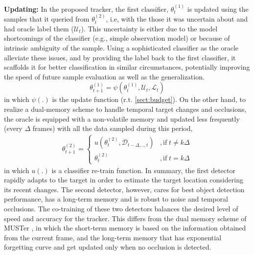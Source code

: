 \documentclass[conference,twoside]{IEEEtran}
\begin{document}
\textbf{Updating:} 
In the proposed tracker, the first classifier, $\theta_t^{(1)}$ is updated using the samples that it queried from $\theta_t^{(2)}$, i.e, with the those it was uncertain about and had oracle label them ($\mathcal{U}_t$). This uncertainty is  either due to the model shortcomings of the classifier (e.g., simple observation model) or because of intrinsic ambiguity of the sample. Using a sophisticated classifier as the oracle alleviate these issues, and by providing the label back to the first classifier, it scaffolds it for better classification in similar circumstances, potentially improving the speed of future sample evaluation as well as the generalization.
\begin{equation}
\theta_{t+1}^{(1)} = \psi( \theta_t^{(1)}, \mathcal{U}_t, \mathcal{L}_t )
\label{eq:update1}
\end{equation}
in which $\psi(.)$ is the update function (r.t. \ref{sect:budget}).
On the other hand, to realize a dual-memory scheme to handle temporal target changes and occlusions, the oracle is equipped with a non-volatile memory and updated less frequently (every $\Delta$ frames) with all the data sampled during this period,
\begin{align}
\theta^{(2)}_{t+1} = 
    \begin{cases}
    u(\theta^{(2)}_t, \mathcal{D}_{t-\Delta,..,t})               &, \mathrm{if} \; t \neq k\Delta \\
    \theta^{(2)}_{t}                                             &, \mathrm{if} \; t = k\Delta
    \end{cases}
\label{eq:update2}
\end{align}
in which $u(.)$ is a classifier re-train function.
In summary, the first detector rapidly adapts to the target in order to estimate the target location considering its recent changes. The second detector, however, cares for best object detection performance, has a long-term memory and is robust to noise and temporal occlusions.  The co-training of these two detectors balances the desired level of speed and accuracy for the tracker. This differs from the dual memory scheme of MUSTer \cite{hong2015multi}, in which the short-term memory is based on the information obtained from the current frame, and the long-term memory that has exponential forgetting curve and get updated only when no occlusion is detected. 
\end{document}
